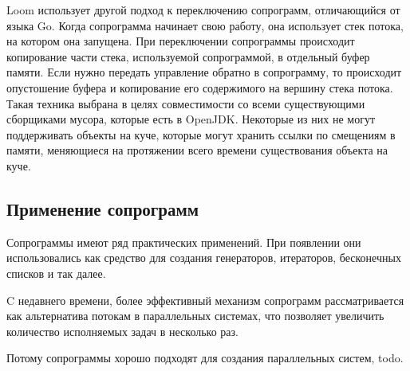 	\par
	Loom использует другой подход к переключению сопрограмм, отличающийся от языка Go. Когда сопрограмма начинает
	свою работу, она использует стек потока, на котором она запущена. При переключении сопрограммы происходит
	копирование части стека, используемой сопрограммой, в отдельный буфер памяти. Если нужно передать 
	управление обратно в сопрограмму, то происходит опустошение буфера и копирование его содержимого на 
	вершину стека потока\cite{loom-main}. Такая техника выбрана в целях совместимости со всеми существующими 
	сборщиками мусора, которые есть в OpenJDK. Некоторые из них не могут поддерживать объекты на куче, которые
	могут хранить ссылки по смещениям в памяти, меняющиеся на протяжении всего времени существования объекта
	на куче.

	\subsection{Применение сопрограмм}
	Сопрограммы имеют ряд практических применений. При появлении они использовались как средство
	для создания генераторов, итераторов, бесконечных списков и так далее. 
	
	C недавнего времени, более эффективный механизм сопрограмм рассматривается
	как альтернатива потокам в параллельных системах, что позволяет увеличить количество исполняемых
	задач в несколько раз.
	
	Потому сопрограммы хорошо подходят для создания параллельных систем, todo.
	
